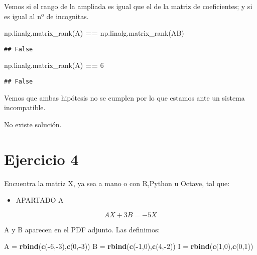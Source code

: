 \documentclass[
]{article}
\newenvironment{Shaded}{\begin{snugshade}}{\end{snugshade}}
\newcommand{\DecValTok}[1]{\textcolor[rgb]{0.00,0.00,0.81}{#1}}
\newcommand{\KeywordTok}[1]{\textcolor[rgb]{0.13,0.29,0.53}{\textbf{#1}}}
\newcommand{\NormalTok}[1]{#1}
\newcommand{\OperatorTok}[1]{\textcolor[rgb]{0.81,0.36,0.00}{\textbf{#1}}}
\newcommand{\StringTok}[1]{\textcolor[rgb]{0.31,0.60,0.02}{#1}}
\providecommand{\tightlist}{%
  \setlength{\itemsep}{0pt}\setlength{\parskip}{0pt}}
\begin{document}
Vemos si el rango de la ampliada es igual que el de la matriz de
coeficientes; y si es igual al nº de incognitas.

\begin{Shaded}
\begin{Highlighting}[]
\NormalTok{np.linalg.matrix_rank(A) }\OperatorTok{==}\NormalTok{ np.linalg.matrix_rank(AB)}
\end{Highlighting}
\end{Shaded}

\begin{verbatim}
## False
\end{verbatim}

\begin{Shaded}
\begin{Highlighting}[]
\NormalTok{np.linalg.matrix_rank(A) }\OperatorTok{==} \DecValTok{6}
\end{Highlighting}
\end{Shaded}

\begin{verbatim}
## False
\end{verbatim}

Vemos que ambas hipótesis no se cumplen por lo que estamos ante un
sistema incompatible.

No existe solución.

\hypertarget{ejercicio-4}{%
\section{Ejercicio 4}\label{ejercicio-4}}

Encuentra la matriz X, ya sea a mano o con R,Python u Octave, tal que:

\begin{itemize}
\tightlist
\item
  APARTADO A
\end{itemize}

\[AX+3B=−5X\]

A y B aparecen en el PDF adjunto. Las definimos:

\begin{Shaded}
\begin{Highlighting}[]
\NormalTok{A =}\StringTok{ }\KeywordTok{rbind}\NormalTok{(}\KeywordTok{c}\NormalTok{(}\OperatorTok{-}\DecValTok{6}\NormalTok{,}\OperatorTok{-}\DecValTok{3}\NormalTok{),}\KeywordTok{c}\NormalTok{(}\DecValTok{0}\NormalTok{,}\OperatorTok{-}\DecValTok{3}\NormalTok{))}
\NormalTok{B =}\StringTok{ }\KeywordTok{rbind}\NormalTok{(}\KeywordTok{c}\NormalTok{(}\OperatorTok{-}\DecValTok{1}\NormalTok{,}\DecValTok{0}\NormalTok{),}\KeywordTok{c}\NormalTok{(}\DecValTok{4}\NormalTok{,}\OperatorTok{-}\DecValTok{2}\NormalTok{))}
\NormalTok{I =}\StringTok{ }\KeywordTok{rbind}\NormalTok{(}\KeywordTok{c}\NormalTok{(}\DecValTok{1}\NormalTok{,}\DecValTok{0}\NormalTok{),}\KeywordTok{c}\NormalTok{(}\DecValTok{0}\NormalTok{,}\DecValTok{1}\NormalTok{))}
\end{Highlighting}
\end{Shaded}
\end{document}
